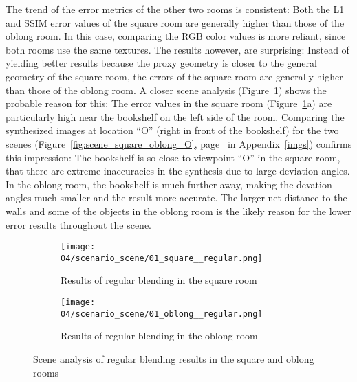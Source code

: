 The trend of the error metrics of the other two rooms is consistent: Both the L1 and SSIM error values of the square room are generally higher than those of the oblong room. In this case, comparing the RGB color values is more reliant, since both rooms use the same textures. The results however, are surprising: Instead of yielding better results because the proxy geometry is closer to the general geometry of the square room, the errors of the square room are generally higher than those of the oblong room. A closer scene analysis (Figure~\ref{fig:scene_regular_square_oblong}) shows the probable reason for this: The error values in the square room (Figure~\ref{fig:scene_regular_square_oblong}a) are particularly high near the bookshelf on the left side of the room. Comparing the synthesized images at location ``O'' (right in front of the bookshelf) for the two scenes (Figure~\ref{fig:scene_square_oblong_O}, page~\pageref{fig:scene_square_oblong_O} in Appendix~\ref{imgs}) confirms this impression: The bookshelf is so close to viewpoint ``O'' in the square room, that there are extreme inaccuracies in the synthesis due to large deviation angles. In the oblong room, the bookshelf is much further away, making the devation angles much smaller and the result more accurate. The larger net distance to the walls and some of the objects in the oblong room is the likely reason for the lower error results throughout the scene.

\begin{figure}
\centering
    \hfill
    \begin{subfigure}[b]{0.45\textwidth}
            \centering
            \texttt{[image: 04/scenario\_scene/01\_square\_\_regular.png]}
            \caption{Results of regular blending in the square room}
    \end{subfigure}
    \hfill
    \begin{subfigure}[b]{0.45\textwidth}
            \centering
            \texttt{[image: 04/scenario\_scene/01\_oblong\_\_regular.png]}
            \caption{Results of regular blending in the oblong room}
    \end{subfigure}
    \hfill
  \caption{Scene analysis of regular blending results in the square and oblong rooms} \label{fig:scene_regular_square_oblong}
\end{figure}

